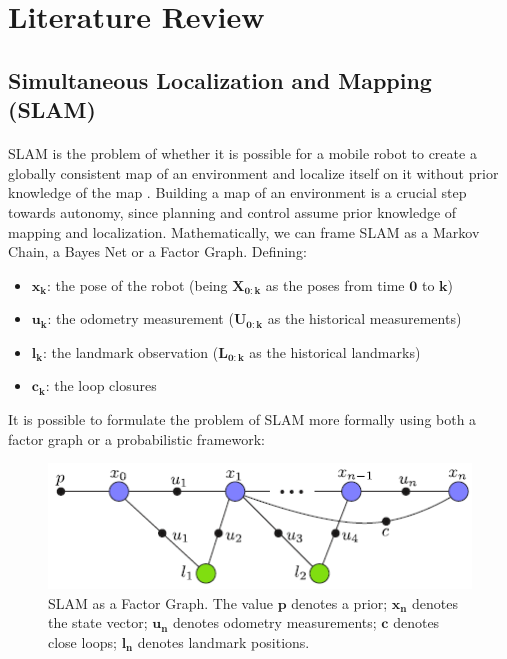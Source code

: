 \documentclass[11pt]{article}
\begin{document}
	\newpage
	\section{Literature Review}
	\subsection{Simultaneous Localization and Mapping (SLAM)}
	\paragraph{}
	SLAM is the problem of whether it is possible for a mobile robot to create a globally consistent map of an environment and localize itself on it without prior knowledge of the map \cite{SLAMPartI}\cite{Cadena}. Building a map of an environment is a crucial step towards autonomy, since planning and control assume prior knowledge of mapping and localization. Mathematically, we can frame SLAM as a Markov Chain, a Bayes Net or a Factor Graph. Defining:
	
	\begin{itemize}
		\item $\mathbf{x_k}$: the pose of the robot (being $\mathbf{X_{0:k}}$ as the poses from time $\mathbf{0}$ to $\mathbf{k}$)
		\item $\mathbf{u_k}$: the odometry measurement ($\mathbf{U_{0:k}}$ as the historical measurements)
		\item $\mathbf{l_k}$: the landmark observation ($\mathbf{L_{0:k}}$ as the historical landmarks)
		\item $\mathbf{c_k}$: the loop closures
	\end{itemize}

	It is possible to formulate the problem of SLAM more formally using both a factor graph or a probabilistic framework:

	\begin{figure}[h]
		\centering
		\includegraphics{SLAMFactorGraph.png}
		\caption{SLAM as a Factor Graph. The value $\mathbf{p}$ denotes a prior; $\mathbf{x_n}$ denotes the state vector; $\mathbf{u_n}$ denotes odometry measurements; $\mathbf{c}$ denotes close loops; $\mathbf{l_n}$ denotes landmark positions.}
		\label{fig:slam1}
	\end{figure}
	
\end{document}
